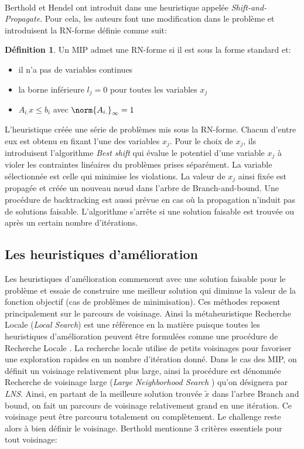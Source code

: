 \documentclass[12pt,a4paper,oneside]{book}
\theoremstyle{definition}
\newtheorem{definition}{Définition}[section]
\begin{document}
	\paragraph{}
	Berthold et Hendel ont introduit dans \cite{Berthold2014} une heuristique appelée \textit{Shift-and-Propagate}. Pour cela, les auteurs font une modification dans le problème et introduisent la RN-forme définie comme suit:
	\begin{definition} \label{def:rnform}
		Un MIP admet une RN-forme si il est sous la forme standard et:
		\begin{itemize}
			\item il n'a pas de variables continues
			\item la borne inférieure $l_j = 0$ pour toutes les variables $x_j$
			\item $A_{i.}x \leq b_i $ avec $\norm{A_{i.}}_\infty = 1$
		\end{itemize}
		
	\end{definition}
	L'heuristique créée une série de problèmes mis sous la RN-forme. Chacun d'entre eux est obtenu en fixant l'une des variables $x_j$. Pour le choix de $x_j$, ils introduisent l'algorithme \textit{Best shift} qui évalue le potentiel d'une variable $x_j$ à violer les contraintes linéaires du problèmes prises séparément. La variable sélectionnée est celle qui minimise les violations. 
	La valeur de $x_j$ ainsi fixée est propagée et créée un nouveau nœud dans l'arbre de Branch-and-bound. Une procédure de backtracking est aussi prévue en cas où la propagation n'induit pas de solutions faisable. L'algorithme s'arrête si une solution faisable est trouvée ou après un certain nombre d'itérations.
	
	\subsection{Les heuristiques d'amélioration}
	Les heuristiques d'amélioration commencent avec une solution faisable pour le problème et essaie de construire une meilleur solution qui diminue la valeur de la fonction objectif (cas de problèmes de minimisation). Ces méthodes reposent principalement sur le parcours de voisinage. Ainsi la métaheuristique Recherche Locale (\textit{Local Search}) est une référence en la matière puisque toutes les heuristiques d'amélioration peuvent être formulées comme une procédure de Recherche Locale \cite{berthold2006}. La recherche locale utilise de petits voisinages pour favoriser une exploration rapides en un nombre d'itération donné. Dans le cas des MIP, on définit un voisinage relativement plus large, ainsi la procédure est dénommée Recherche de voisinage large (\textit{Large Neighborhood Search} ) qu'on désignera par \textit{LNS}. Ainsi, en partant de la meilleure solution trouvée $\tilde{x}$ dans l'arbre Branch and bound, on fait un parcours de voisinage relativement grand en une itération. Ce voisinage peut être parcouru totalement ou complètement. Le challenge reste alors à bien définir le voisinage. Berthold \cite{berthold2014heuristic} mentionne 3 critères essentiels pour tout voisinage:
	
\end{document}
